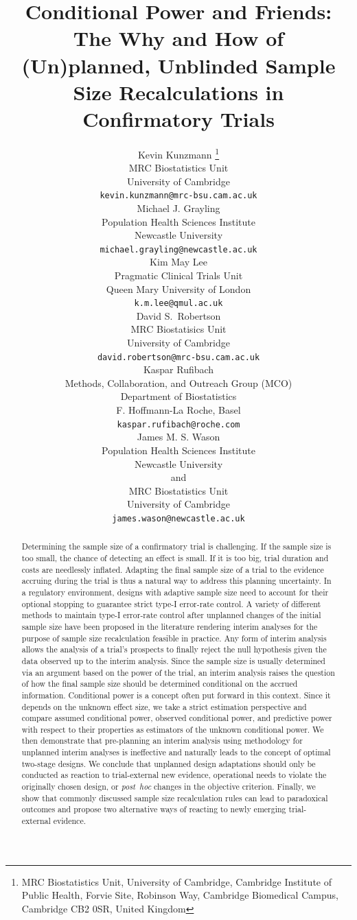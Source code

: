 \documentclass{article}
\title{Conditional Power and Friends: The Why and How of (Un)planned, Unblinded Sample Size Recalculations in Confirmatory Trials}
\author{
  Kevin Kunzmann \thanks{
        MRC Biostatistics Unit, University of Cambridge,
        Cambridge Institute of Public Health,
        Forvie Site, Robinson Way,
        Cambridge Biomedical Campus,
        Cambridge CB2 0SR,
        United Kingdom
    }\\
    MRC Biostatistics Unit \\
    University of Cambridge \\
    \texttt{kevin.kunzmann@mrc-bsu.cam.ac.uk} \\
    Michael J. Grayling \\
    Population Health Sciences Institute \\
    Newcastle University \\
    \texttt{michael.grayling@newcastle.ac.uk} \\
    Kim May Lee \\
    Pragmatic Clinical Trials Unit\\
    Queen Mary University of London\\
    \texttt{k.m.lee@qmul.ac.uk} \\
    David S.\ Robertson \\
    MRC Biostatisics Unit\\
    University of Cambridge\\
    \texttt{david.robertson@mrc-bsu.cam.ac.uk} \\
    Kaspar Rufibach \\
    Methods, Collaboration, and Outreach Group (MCO) \\
    Department of Biostatistics\\
    F. Hoffmann-La Roche, Basel\\
    \texttt{kaspar.rufibach@roche.com} \\
    James M. S. Wason \\
    Population Health Sciences Institute \\
    Newcastle University\\
    and \\
     MRC Biostatistics Unit \\
    University of Cambridge \\
    \texttt{james.wason@newcastle.ac.uk}
}
\begin{document}
\maketitle

\captionsetup{width=\textwidth}


\newpage

\begin{abstract}
Determining the sample size of a confirmatory trial is challenging.
If the sample size is too small, the chance of detecting an effect is small.
If it is too big, trial duration and costs are needlessly inflated.
Adapting the final sample size of a trial to the evidence accruing 
during the trial is thus a natural way to address 
this planning uncertainty.
In a regulatory environment, 
designs with adaptive sample size need to 
account for their optional stopping to guarantee
strict type-I error-rate control. 
A variety of different methods to maintain type-I error-rate control
after unplanned changes of the initial sample size have been proposed 
in the literature rendering interim analyses for
the purpose of sample size recalculation feasible in
practice.
Any form of interim analysis allows the analysis of
a trial's prospects to finally reject the null hypothesis 
given the data observed up to the interim analysis.
Since the sample size is usually determined via an 
argument based on the power of the trial, 
an interim analysis raises the question of
how the final sample size should be determined conditional on the accrued information.
Conditional power is a concept often put forward in this context.
Since it depends on the unknown effect size, 
we take a strict estimation perspective and compare
assumed conditional power, observed conditional power, 
and predictive power with respect to their properties as estimators 
of the unknown conditional power.
We then demonstrate that pre-planning an interim analysis using 
methodology for unplanned interim analyses is ineffective and 
naturally leads to the concept of optimal two-stage designs.
We conclude that unplanned design adaptations should only be conducted
as reaction to trial-external new evidence, operational needs to violate the originally chosen design, 
or \textit{post~hoc} changes in the objective criterion.
Finally, we show that commonly discussed sample size recalculation rules can lead to paradoxical outcomes and propose two alternative ways of reacting to
newly emerging trial-external evidence.
\end{abstract}
\end{document}
